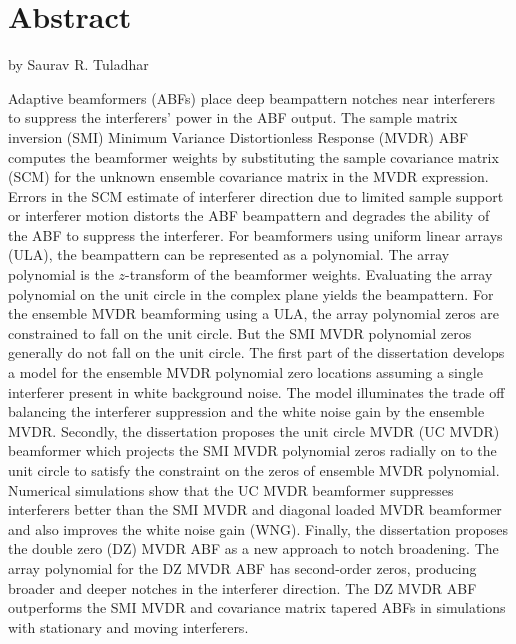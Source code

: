 \doublespacing
\chapter*{Abstract}
\thesistitle
\begin{flushleft}
by Saurav R. Tuladhar \\
\end{flushleft}

Adaptive beamformers (ABFs) place deep beampattern notches near
interferers to suppress the interferers’ power in the ABF output. The
sample matrix inversion (SMI) Minimum Variance Distortionless Response
(MVDR) ABF computes the beamformer weights by substituting the sample
covariance matrix (SCM) for the unknown ensemble covariance matrix in
the MVDR expression. Errors in the SCM estimate of interferer
direction due to limited sample support or interferer motion distorts
the ABF beampattern and degrades the ability of the ABF to suppress
the interferer. For beamformers using uniform linear arrays (ULA), the
beampattern can be represented as a polynomial. The array polynomial
is the $z$-transform of the beamformer weights. Evaluating the array
polynomial on the unit circle in the complex plane yields the
beampattern. For the ensemble MVDR beamforming using a ULA, the array
polynomial zeros are constrained to fall on the unit circle. But the
SMI MVDR polynomial zeros generally do not fall on the unit
circle. The first part of the dissertation develops a model for the
ensemble MVDR polynomial zero locations assuming a single interferer
present in white background noise. The model illuminates the trade off
balancing the interferer suppression and the white noise gain by the
ensemble MVDR. Secondly, the dissertation proposes the unit circle
MVDR (UC MVDR) beamformer which projects the SMI MVDR polynomial zeros
radially on to the unit circle to satisfy the constraint on the zeros
of ensemble MVDR polynomial. Numerical simulations show that the UC
MVDR beamformer suppresses interferers better than the SMI MVDR and
diagonal loaded MVDR beamformer and also improves the white noise gain
(WNG). Finally, the dissertation proposes the double zero (DZ) MVDR
ABF as a new approach to notch broadening. The array polynomial for
the DZ MVDR ABF has second-order zeros, producing broader and deeper
notches in the interferer direction. The DZ MVDR ABF outperforms the
SMI MVDR and covariance matrix tapered ABFs in simulations with
stationary and moving interferers.

